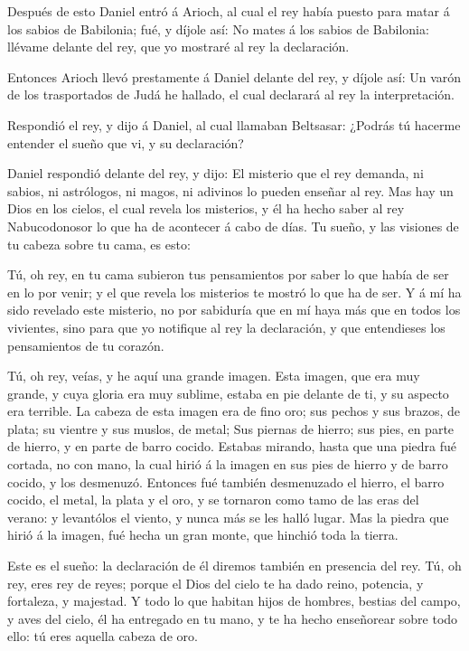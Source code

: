  Después de esto Daniel entró á Arioch, al cual el rey
había puesto para matar á los sabios de Babilonia; fué, y díjole así: No
mates á los sabios de Babilonia: llévame delante del rey, que yo
mostraré al rey la declaración.

 Entonces Arioch llevó prestamente á Daniel delante del
rey, y díjole así: Un varón de los trasportados de Judá he hallado, el
cual declarará al rey la interpretación.

 Respondió el rey, y dijo á Daniel, al cual llamaban
Beltsasar: ¿Podrás tú hacerme entender el sueño que vi, y su
declaración?

 Daniel respondió delante del rey, y dijo: El misterio que
el rey demanda, ni sabios, ni astrólogos, ni magos, ni adivinos lo
pueden enseñar al rey.  Mas hay un Dios en los cielos, el
cual revela los misterios, y él ha hecho saber al rey Nabucodonosor lo
que ha de acontecer á cabo de días. Tu sueño, y las visiones de tu
cabeza sobre tu cama, es esto:

 Tú, oh rey, en tu cama subieron tus pensamientos por saber
lo que había de ser en lo por venir; y el que revela los misterios te
mostró lo que ha de ser.  Y á mí ha sido revelado este
misterio, no por sabiduría que en mí haya más que en todos los
vivientes, sino para que yo notifique al rey la declaración, y que
entendieses los pensamientos de tu corazón.

 Tú, oh rey, veías, y he aquí una grande imagen. Esta
imagen, que era muy grande, y cuya gloria era muy sublime, estaba en pie
delante de ti, y su aspecto era terrible.  La cabeza de
esta imagen era de fino oro; sus pechos y sus brazos, de plata; su
vientre y sus muslos, de metal;  Sus piernas de hierro; sus
pies, en parte de hierro, y en parte de barro cocido. 
Estabas mirando, hasta que una piedra fué cortada, no con mano, la cual
hirió á la imagen en sus pies de hierro y de barro cocido, y los
desmenuzó.  Entonces fué también desmenuzado el hierro, el
barro cocido, el metal, la plata y el oro, y se tornaron como tamo de
las eras del verano: y levantólos el viento, y nunca más se les halló
lugar. Mas la piedra que hirió á la imagen, fué hecha un gran monte, que
hinchió toda la tierra.

 Este es el sueño: la declaración de él diremos también en
presencia del rey.  Tú, oh rey, eres rey de reyes; porque
el Dios del cielo te ha dado reino, potencia, y fortaleza, y majestad.
 Y todo lo que habitan hijos de hombres, bestias del campo,
y aves del cielo, él ha entregado en tu mano, y te ha hecho enseñorear
sobre todo ello: tú eres aquella cabeza de oro.

